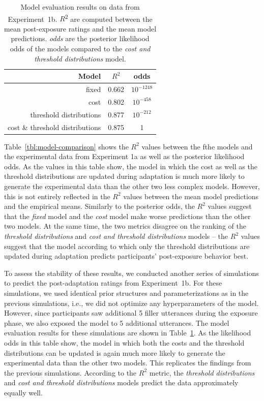 \documentclass[lucida,biblatex]{sp} %
\begin{document}
\begin{table}
\center
\begin{tabular}{r | c | c }
Model & $R^2$ &   odds  \\ \midrule
fixed & 0.662 & $10^{-1248}$    \\
cost & 0.802 &  $10^{-458}$  \\
threshold distributions & 0.877 & $10^{-212}$  \\
cost \& threshold distributions & 0.875 & 1 \\
\end{tabular}
\caption{Model evaluation results on data from Experiment~1b.  $R$\textsuperscript{$2$} are computed between  the mean post-exposure ratings and the mean model predictions. \textit{odds} are the posterior likelihood odds of the models compared to the \textit{cost and threshold distributions} model.  \label{tbl:model-comparison-replication}}
\end{table}

Table~\ref{tbl:model-comparison} shows the $R^2$ values between the fthe models and the experimental data from Experiment 1a 
as well as the posterior likelihood odds. As the values in this table show, the model in which the cost as well as the threshold 
 distributions are updated during adaptation is much more likely to generate the experimental data than the other 
 two less complex models. However, this is not entirely reflected in the $R^2$ values between the mean model predictions
 and the empirical means. Similarly to the posterior odds, the $R^2$ values suggest that the \textit{fixed} model
 and the \textit{cost} model make worse predictions than the other two models. At the same time, the two metrics disagree on the 
 ranking of the \textit{threshold distributions} and \textit{cost and threshold distributions} models -- the $R^2$ values suggest
 that the model according to which only the threshold distributions are updated during adaptation predicts 
 participants' post-exposure behavior best.
 
 To assess the stability of these results, we conducted another series of simulations to predict the post-adaptation
 ratings from Experiment~1b. For these simulations, we used identical prior structures and parameterizations as in
 the previous simulations, i.e., we did not optimize any hyperparameters of the model. However, 
 since participants saw additional 5 filler utterances during the exposure phase, we also exposed the model to 5 additional utterances. 
 The model 
evaluation results for these simulations are shown in Table~\ref{tbl:model-comparison-replication}. As the likelihood odds
in this table show, the model in which both the costs and the threshold distributions can be updated is again much more
likely to generate the experimental data than the other two models. This replicates the findings from the previous simulations.
According to the $R^2$ metric, the \textit{threshold distributions} and \textit{cost and threshold distributions} models predict
the data approximately equally well.
\end{document}
